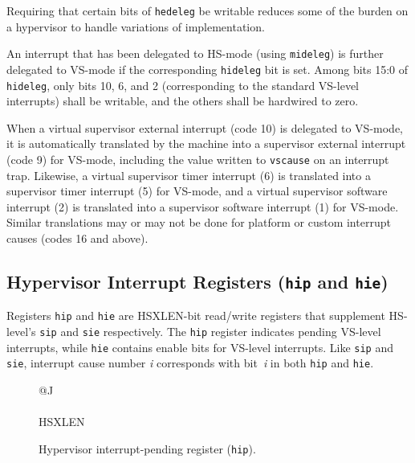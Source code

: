 \begin{commentary}
Requiring that certain bits of {\tt hedeleg} be writable reduces some of
the burden on a hypervisor to handle variations of implementation.
\end{commentary}

An interrupt that has been delegated to HS-mode (using {\tt mideleg}) is
further delegated to VS-mode if the corresponding {\tt hideleg} bit is
set.
Among bits 15:0 of {\tt hideleg}, only bits 10, 6, and 2 (corresponding
to the standard VS-level interrupts) shall be writable, and the others
shall be hardwired to zero.

When a virtual supervisor external interrupt (code 10) is delegated to
VS-mode, it is automatically translated by the machine into a supervisor
external interrupt (code 9) for VS-mode, including the value written to
{\tt vscause} on an interrupt trap.
Likewise, a virtual supervisor timer interrupt (6) is translated into a
supervisor timer interrupt (5) for VS-mode, and a virtual supervisor
software interrupt (2) is translated into a supervisor software interrupt
(1) for VS-mode.
Similar translations may or may not be done for platform or custom
interrupt causes (codes 16 and above).

\subsection{Hypervisor Interrupt Registers ({\tt hip} and {\tt hie})}
\label{sec:hinterruptregs}

Registers {\tt hip} and {\tt hie} are HSXLEN-bit read/write registers
that supplement HS-level's {\tt sip} and {\tt sie} respectively.
The {\tt hip} register indicates pending VS-level interrupts, while
{\tt hie} contains enable bits for VS-level interrupts.
Like {\tt sip} and {\tt sie}, interrupt cause number \textit{i}
corresponds with bit~\textit{i} in both {\tt hip} and {\tt hie}.

\begin{figure}[h!]
{\footnotesize
\begin{center}
\begin{tabular}{@{}J}
 \\
\hline
{} \\
\hline
HSXLEN \\
\end{tabular}
\end{center}
}
\vspace{-0.1in}
\caption{Hypervisor interrupt-pending register ({\tt hip}).}
\label{hipreg}
\end{figure}

